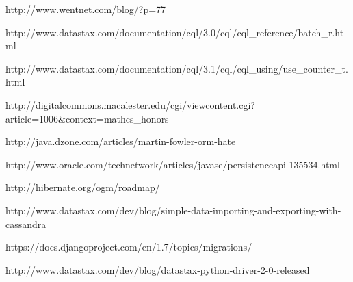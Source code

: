\begin{thebibliography}{9}
http://www.wentnet.com/blog/?p=77

http://www.datastax.com/documentation/cql/3.0/cql/cql\_reference/batch\_r.html

http://www.datastax.com/documentation/cql/3.1/cql/cql\_using/use\_counter\_t.html

http://digitalcommons.macalester.edu/cgi/viewcontent.cgi?article=1006\&context=mathcs\_honors

http://java.dzone.com/articles/martin-fowler-orm-hate

http://www.oracle.com/technetwork/articles/javase/persistenceapi-135534.html

http://hibernate.org/ogm/roadmap/

http://www.datastax.com/dev/blog/simple-data-importing-and-exporting-with-cassandra

https://docs.djangoproject.com/en/1.7/topics/migrations/

http://www.datastax.com/dev/blog/datastax-python-driver-2-0-released

\end{thebibliography}
